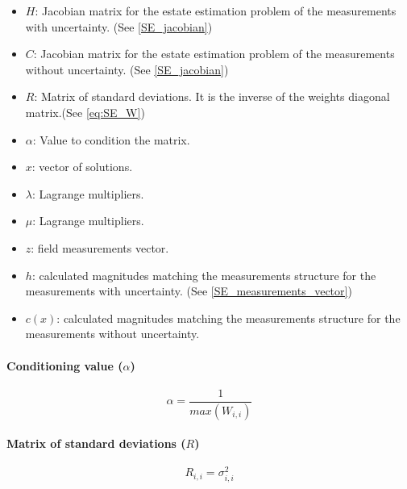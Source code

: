 \documentclass[nols,a4paper,twoside,notoc,fleqn]{tufte-book}
\begin{document}
\begin{itemize}
	\item $H$: Jacobian matrix for the estate estimation problem of the measurements with uncertainty. (See \ref{SE_jacobian})
	\item $C$: Jacobian matrix for the estate estimation problem of the measurements without uncertainty. (See \ref{SE_jacobian})
	\item $R$: Matrix of standard deviations. It is the inverse of the weights diagonal matrix.(See \ref{eq:SE_W})
	\item $\alpha$: Value to condition the matrix. 
	\item $x$: vector of solutions.
	\item $\lambda$: Lagrange multipliers.
	\item $\mu$: Lagrange multipliers.
	\item $z$: field measurements vector.
	\item $h$: calculated magnitudes matching the measurements structure for the measurements with uncertainty. (See \ref{SE_measurements_vector})
	\item $c(x)$: calculated magnitudes matching the measurements structure for the measurements without uncertainty.
\end{itemize}


\paragraph{Conditioning value ($\alpha$)}

\begin{equation}
\alpha = \frac{1}{max(W_{i, i})}
\end{equation}


\paragraph{Matrix of standard deviations ($R$)}

\begin{equation}
R_{i, i} = \sigma_{i, i}^2
\end{equation}


\end{document}
